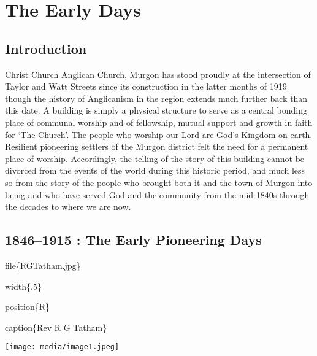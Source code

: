 \hypertarget{the-early-days}{%
\chapter{The Early Days}\label{the-early-days}}

\hypertarget{introduction}{%
\section{Introduction}\label{introduction}}

Christ Church Anglican Church, Murgon has stood proudly at the
intersection of Taylor and Watt Streets since its construction in the
latter months of 1919 though the history of Anglicanism in the region
extends much further back than this date. A building is simply a
physical structure to serve as a central bonding place of communal
worship and of fellowship, mutual support and growth in faith for `The
Church'. The people who worship our Lord are God's Kingdom on earth.
Resilient pioneering settlers of the Murgon district felt the need for a
permanent place of worship. Accordingly, the telling of the story of
this building cannot be divorced from the events of the world during
this historic period, and much less so from the story of the people who
brought both it and the town of Murgon into being and who have served
God and the community from the mid-1840s through the decades to where we
are now.

\hypertarget{the-early-pioneering-days}{%
\section{1846--1915 : The Early Pioneering
Days}\label{the-early-pioneering-days}}

file\{RGTatham.jpg\}

width\{.5\}

position\{R\}

caption\{Rev R G Tatham\}

\texttt{[image: media/image1.jpeg]}

